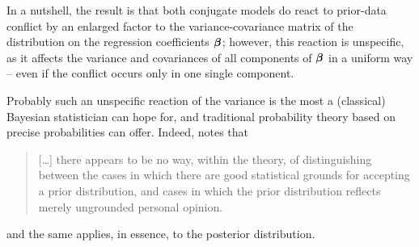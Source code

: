 In a nutshell, the result is that both conjugate models do react
to prior-data conflict by an enlarged factor to the variance-covariance matrix
of the distribution on the regression coefficients $\boldsymbol{\beta}$; however, this reaction is unspecific, as it affects the
variance and covariances of all components of $\boldsymbol{\beta}$ in a uniform way
-- even if the conflict occurs only in one single component.

Probably such an unspecific reaction of the variance is the most a (classical)
Bayesian statistician can hope for, and traditional probability theory based on precise probabilities can offer.
Indeed, \textcite{1987:kyburg:ess} notes that
\begin{quotation}
\begin{small}
[\ldots] there appears to be no way, within the theory, of
distinguishing between the cases in which there are good statistical grounds
for accepting a prior distribution, and cases in which the prior distribution
reflects merely ungrounded personal opinion.%
\end{small}
\end{quotation}
and the same applies, in essence, to the posterior distribution.

